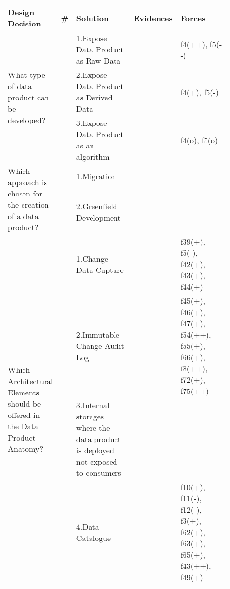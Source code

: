 \begin{tabular}{|p{0.12\linewidth}|p{0.015\linewidth}|p{0.3\linewidth}|p{0.15\linewidth}|p{0.31\linewidth}|}
\hline
{\bf Design Decision} & {\bf \#} & {\bf Solution} & {\bf Evidences} & {\bf Forces}\\
\hline
\multirow{3}{\linewidth}{What type of data product can be developed?} &\cellcolor{emerald_shape_3}{} &1.Expose Data Product as Raw Data&\cellcolor{emerald_shape_7}{s1, s2, s6, s7, s9, s14, s15, s27, s34, s43} & f4(++), f5(-{}-)\\
 & \cellcolor{emerald_shape_3}{} & 2.Expose Data Product as Derived Data&\cellcolor{emerald_shape_7}{s1, s2, s6, s9, s14, s15, s27, s34} & f4(+), f5(-)\\
 & \multirow{-3}{\linewidth}{ \cellcolor{emerald_shape_3}{10}} &3.Expose Data Product as an algorithm&\cellcolor{emerald_shape_4}{s2, s6} & f4(o), f5(o)\\
\multirow{2}{\linewidth}{Which approach is chosen for the creation of a data product?} &\cellcolor{emerald_shape_6}{} &1.Migration&\cellcolor{emerald_shape_5}{s7, s8, s9, s23, s38, s39, s41, s43, s44, s45, s48, s56, s57} & \\
 & \multirow{-2}{\linewidth}{ \cellcolor{emerald_shape_6}{34}} &2.Greenfield Development&\cellcolor{emerald_shape_7}{s1, s2, s3, s5, s6, s7, s8, s9, s11, s14, s15, s18, s20, s23, s25, s28, s30, s31, s32, s33, s35, s37, s38, s39, s40, s41, s42, s43, s45, s49} & \\
\multirow{6}{\linewidth}{Which Architectural Elements should be offered in the Data Product Anatomy?} &\cellcolor{emerald_shape_6}{} &1.Change Data Capture&\cellcolor{emerald_shape_4}{s4, s17, s20, s38, s45, s48, s53, s54, s55, s56} & f39(+), f5(-), f42(+), f43(+), f44(+)\\
 & \cellcolor{emerald_shape_6}{} & 2.Immutable Change Audit Log&\cellcolor{emerald_shape_5}{s4, s8, s12, s31, s32, s35, s36, s45, s47, s48, s53, s54, s55, s56, s57} & f45(+), f46(+), f47(+), f54(++), f55(+), f66(+), f8(++), f72(+), f75(++)\\
 & \cellcolor{emerald_shape_6}{} & 3.Internal storages where the data product is deployed, not exposed to consumers&\cellcolor{emerald_shape_3}{s4, s13, s15, s32, s33, s36, s49} & \\
 & \cellcolor{emerald_shape_6}{} & 4.Data Catalogue&\cellcolor{emerald_shape_5}{s1, s3, s5, s7, s9, s15, s16, s25, s30, s31, s32, s37, s43, s47, s48, s53, s55} & f10(+), f11(-), f12(-), f3(+), f62(+), f63(+), f65(+), f43(++), f49(+)\\

\end{tabular}
